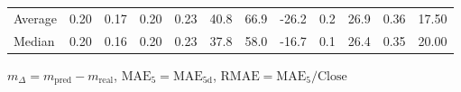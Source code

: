 \begin{threeparttable}
{\begin{tabular}{lrrrrrrrrrrr}
Average &          0.20 &          0.17 &          0.20 &        0.23 &                40.8 &                66.9 &      -26.2 &                 0.2 &             26.9 &            0.36 &                  17.50 \\
 Median &          0.20 &          0.16 &          0.20 &        0.23 &                37.8 &                58.0 &      -16.7 &                 0.1 &             26.4 &            0.35 &                  20.00 \\
\bottomrule
\end{tabular}
}
\begin{tablenotes}\footnotesize
\item $m_\Delta=m_{\text{pred}}-m_{\text{real}}$,
$\mathrm{MAE}_5=\mathrm{MAE}_{5\text{d}}$,
$\mathrm{RMAE}=\mathrm{MAE}_5/\text{Close}$
\end{tablenotes}
\end{threeparttable}
\endgroup

